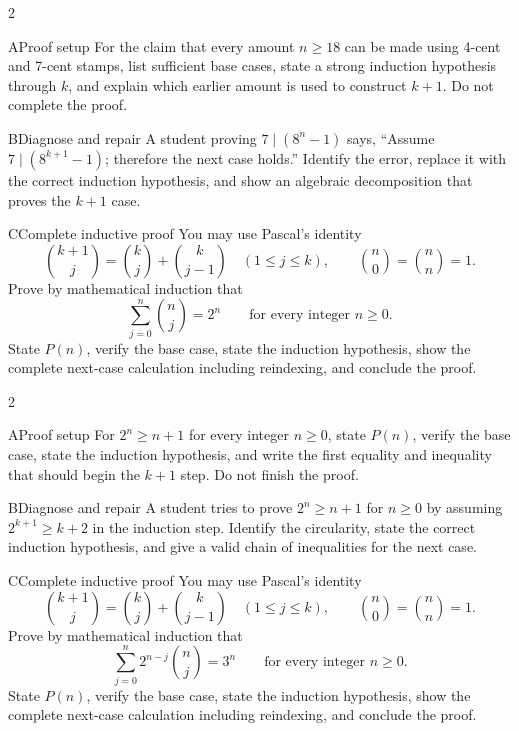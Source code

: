 \documentclass[9pt]{extarticle}
\begin{document}
\CoreWorkArea
\FormBreak
{}
\begin{multicols}{2}
\begin{CompactCoreProblem}{A}{Proof setup}
For the claim that every amount $n\ge18$ can be made using 4-cent and 7-cent stamps, list sufficient base cases, state a strong induction hypothesis through $k$, and explain which earlier amount is used to construct $k+1$. Do not complete the proof.
\end{CompactCoreProblem}
\begin{CompactCoreProblem}{B}{Diagnose and repair}
A student proving $7\mid(8^n-1)$ says, “Assume $7\mid(8^{k+1}-1)$; therefore the next case holds.” Identify the error, replace it with the correct induction hypothesis, and show an algebraic decomposition that proves the $k+1$ case.
\end{CompactCoreProblem}
\end{multicols}
\begin{CompactCoreProblem}{C}{Complete inductive proof}
You may use Pascal's identity
\[
\binom{k+1}{j}=\binom{k}{j}+\binom{k}{j-1}
\quad(1\le j\le k),\qquad
\binom{n}{0}=\binom{n}{n}=1.
\]
Prove by mathematical induction that
\[
\sum_{j=0}^{n}\binom{n}{j}=2^n\qquad\text{for every integer }n\ge0.
\]
State $P(n)$, verify the base case, state the induction hypothesis, show the complete next-case calculation including reindexing, and conclude the proof.
\end{CompactCoreProblem}
\CoreWorkArea
\FormBreak
{}
\begin{multicols}{2}
\begin{CompactCoreProblem}{A}{Proof setup}
For $2^n\ge n+1$ for every integer $n\ge0$, state $P(n)$, verify the base case, state the induction hypothesis, and write the first equality and inequality that should begin the $k+1$ step. Do not finish the proof.
\end{CompactCoreProblem}
\begin{CompactCoreProblem}{B}{Diagnose and repair}
A student tries to prove $2^n\ge n+1$ for $n\ge0$ by assuming $2^{k+1}\ge k+2$ in the induction step. Identify the circularity, state the correct induction hypothesis, and give a valid chain of inequalities for the next case.
\end{CompactCoreProblem}
\end{multicols}
\begin{CompactCoreProblem}{C}{Complete inductive proof}
You may use Pascal's identity
\[
\binom{k+1}{j}=\binom{k}{j}+\binom{k}{j-1}
\quad(1\le j\le k),\qquad
\binom{n}{0}=\binom{n}{n}=1.
\]
Prove by mathematical induction that
\[
\sum_{j=0}^{n} 2^{n-j}\binom{n}{j}=3^n\qquad\text{for every integer }n\ge0.
\]
State $P(n)$, verify the base case, state the induction hypothesis, show the complete next-case calculation including reindexing, and conclude the proof.
\end{CompactCoreProblem}
\end{document}
